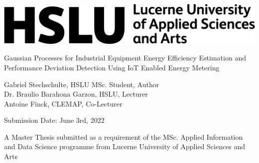 \begin{titlepage}
    \begin{center}
        \includegraphics[]{images/hslu_logo.png}
        \vfill
        
        \huge{Gaussian Processes for Industrial Equipment Energy Efficiency Estimation and Performance Deviation Detection Using IoT Enabled Energy Metering}
        
        \vfill
        
        \large{Gabriel Stechschulte, HSLU MSc. Student, Author} \\[10pt]
        \large{Dr. Braulio Barahona Garzon, HSLU, Lecturer} \\[10pt]
        \large{Antoine Finck, CLEMAP, Co-Lecturer}
        
        \vfill
        
        \large{Submission Date: June 3rd, 2022} 
        
        \vfill
        
        A Master Thesis submitted as a requirement of the MSc. Applied Information and Data Science programme from Lucerne University of Applied Sciences and Arts
    \end{center}
\end{titlepage}